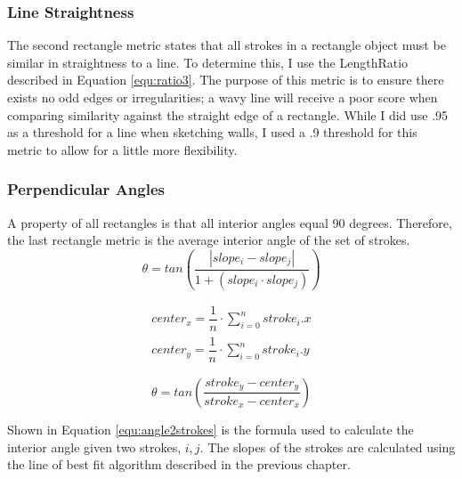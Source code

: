 \subsubsection{Line Straightness}
The second rectangle metric states that all strokes in a rectangle object must be similar in straightness to a line. To determine this, I use the LengthRatio described in Equation \ref{equ:ratio3}. The purpose of this metric is to ensure there exists no odd edges or irregularities; a wavy line will receive a poor score when comparing similarity against the straight edge of a rectangle. While I did use .95 as a threshold for a line when sketching walls, I used a .9 threshold for this metric to allow for a little more flexibility.

\subsubsection{Perpendicular Angles}

A property of all rectangles is that all interior angles equal 90 degrees. Therefore, the last rectangle metric is the average interior angle of the set of strokes.\\

\begin{equation}
\label{equ:angle2strokes}
\theta = tan(\dfrac{|slope_i - slope_{j}|}{1 + (slope_i \cdot slope_{j})})
\end{equation}

\begin{equation}
\label{equ:center}
\begin{aligned}
center_x = \dfrac{1}{n} \cdot \sum_{i=0}^{n} stroke_i.x
\\[1pt]
center_y = \dfrac{1}{n} \cdot \sum_{i=0}^{n} stroke_i.y
\end{aligned}
\end{equation}

\begin{equation}
\label{equ:anglecenter}
\theta = tan(\dfrac{stroke_y - center_y}{stroke_x - center_x})
\end{equation}

Shown in Equation \ref{equ:angle2strokes} is the formula used to calculate the interior angle given two strokes, $i,j$. The slopes of the strokes are calculated using the line of best fit algorithm described in the previous chapter. 

